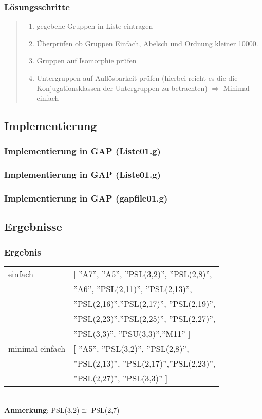 \documentclass{beamer}
\begin{document}
\begin{frame}
	\frametitle{Lösungsschritte}
	\begin{quote}
	 \begin{enumerate}[1.]
	  \item gegebene Gruppen in Liste eintragen
	  \item Überprüfen ob Gruppen Einfach, Abelsch und Ordnung kleiner 10000.
	  \item Gruppen auf Isomorphie prüfen
	  \item Untergruppen auf Auflösbarkeit prüfen (hierbei reicht es die die Konjugationsklassen der Untergruppen
	  zu betrachten) $\Rightarrow$ Minimal einfach
	 \end{enumerate}

		 
	\end{quote}
\end{frame}
\subsection{Implementierung}

\begin{frame}
	\frametitle{Implementierung in GAP (Liste01.g)}
	 
		 
\end{frame}

\begin{frame}
	\frametitle{Implementierung in GAP (Liste01.g)}
	 
		 
\end{frame}

\begin{frame}
	\frametitle{Implementierung in GAP (gapfile01.g)}
	 
		 
\end{frame}
\subsection{Ergebnisse}

\begin{frame}
	\frametitle{Ergebnis}
	 
\begin{tabular}{ll}
einfach & 	[ ''A7'', ''A5'', ''PSL(3,2)'', ''PSL(2,8)'',\\
&		 ''A6'', ''PSL(2,11)'', ''PSL(2,13)'', \\
&		 ''PSL(2,16)'',''PSL(2,17)'', ''PSL(2,19)'', \\
&		 ''PSL(2,23)'',''PSL(2,25)'', ''PSL(2,27)'', \\
&		''PSL(3,3)'', ''PSU(3,3)'',''M11'' ]\\
minimal einfach & [ ''A5'', ''PSL(3,2)'', ''PSL(2,8)'', \\ 
&		''PSL(2,13)'', ''PSL(2,17)'',''PSL(2,23)'', \\
&		''PSL(2,27)'', ''PSL(3,3)'' ]
	 \end{tabular}\\
	 
	 \textbf{Anmerkung}: PSL(3,2)$\cong$ PSL(2,7)
		 
\end{frame}
\end{document}
